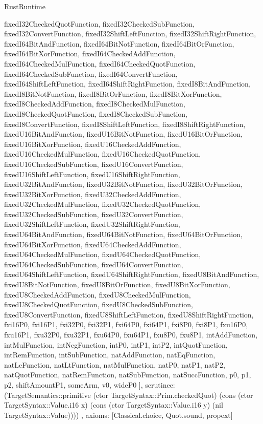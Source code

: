\begin{lexlean}{RustRuntime}
\begin{semanticmodule}
{{      fixedI32CheckedQuotFunction,
      fixedI32CheckedSubFunction,
      fixedI32ConvertFunction,
      fixedI32ShiftLeftFunction,
      fixedI32ShiftRightFunction,
      fixedI64BitAndFunction,
      fixedI64BitNotFunction,
      fixedI64BitOrFunction,
      fixedI64BitXorFunction,
      fixedI64CheckedAddFunction,
      fixedI64CheckedMulFunction,
      fixedI64CheckedQuotFunction,
      fixedI64CheckedSubFunction,
      fixedI64ConvertFunction,
      fixedI64ShiftLeftFunction,
      fixedI64ShiftRightFunction,
      fixedI8BitAndFunction,
      fixedI8BitNotFunction,
      fixedI8BitOrFunction,
      fixedI8BitXorFunction,
      fixedI8CheckedAddFunction,
      fixedI8CheckedMulFunction,
      fixedI8CheckedQuotFunction,
      fixedI8CheckedSubFunction,
      fixedI8ConvertFunction,
      fixedI8ShiftLeftFunction,
      fixedI8ShiftRightFunction,
      fixedU16BitAndFunction,
      fixedU16BitNotFunction,
      fixedU16BitOrFunction,
      fixedU16BitXorFunction,
      fixedU16CheckedAddFunction,
      fixedU16CheckedMulFunction,
      fixedU16CheckedQuotFunction,
      fixedU16CheckedSubFunction,
      fixedU16ConvertFunction,
      fixedU16ShiftLeftFunction,
      fixedU16ShiftRightFunction,
      fixedU32BitAndFunction,
      fixedU32BitNotFunction,
      fixedU32BitOrFunction,
      fixedU32BitXorFunction,
      fixedU32CheckedAddFunction,
      fixedU32CheckedMulFunction,
      fixedU32CheckedQuotFunction,
      fixedU32CheckedSubFunction,
      fixedU32ConvertFunction,
      fixedU32ShiftLeftFunction,
      fixedU32ShiftRightFunction,
      fixedU64BitAndFunction,
      fixedU64BitNotFunction,
      fixedU64BitOrFunction,
      fixedU64BitXorFunction,
      fixedU64CheckedAddFunction,
      fixedU64CheckedMulFunction,
      fixedU64CheckedQuotFunction,
      fixedU64CheckedSubFunction,
      fixedU64ConvertFunction,
      fixedU64ShiftLeftFunction,
      fixedU64ShiftRightFunction,
      fixedU8BitAndFunction,
      fixedU8BitNotFunction,
      fixedU8BitOrFunction,
      fixedU8BitXorFunction,
      fixedU8CheckedAddFunction,
      fixedU8CheckedMulFunction,
      fixedU8CheckedQuotFunction,
      fixedU8CheckedSubFunction,
      fixedU8ConvertFunction,
      fixedU8ShiftLeftFunction,
      fixedU8ShiftRightFunction,
      fxi16P0,
      fxi16P1,
      fxi32P0,
      fxi32P1,
      fxi64P0,
      fxi64P1,
      fxi8P0,
      fxi8P1,
      fxu16P0,
      fxu16P1,
      fxu32P0,
      fxu32P1,
      fxu64P0,
      fxu64P1,
      fxu8P0,
      fxu8P1,
      intAddFunction,
      intMulFunction,
      intNegFunction,
      intP0,
      intP1,
      intP2,
      intQuotFunction,
      intRemFunction,
      intSubFunction,
      natAddFunction,
      natEqFunction,
      natLeFunction,
      natLtFunction,
      natMulFunction,
      natP0,
      natP1,
      natP2,
      natQuotFunction,
      natRemFunction,
      natSubFunction,
      natSuccFunction,
      p0,
      p1,
      p2,
      shiftAmountP1,
      someArm,
      v0,
      wideP0
    ],
    scrutinee: (TargetSemantics::primitive (ctor TargetSyntax::Prim.checkedQuot) (cons (ctor TargetSyntax::Value.i16 x) (cons (ctor TargetSyntax::Value.i16 y) (nil TargetSyntax::Value))))
  },
  axioms: [Classical.choice, Quot.sound, propext]
}


\end{semanticmodule}
\end{lexlean}
